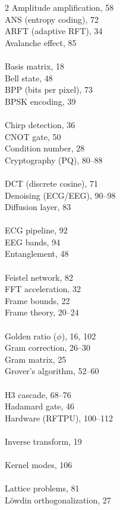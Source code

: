 \documentclass[11pt, a4paper, openany]{book}
\theoremstyle{definition}
\begin{document}
\begin{multicols}{2}
\noindent
Amplitude amplification, 58 \\
ANS (entropy coding), 72 \\
ARFT (adaptive RFT), 34 \\
Avalanche effect, 85 \\
\\
Basis matrix, 18 \\
Bell state, 48 \\
BPP (bits per pixel), 73 \\
BPSK encoding, 39 \\
\\
Chirp detection, 36 \\
CNOT gate, 50 \\
Condition number, 28 \\
Cryptography (PQ), 80--88 \\
\\
DCT (discrete cosine), 71 \\
Denoising (ECG/EEG), 90--98 \\
Diffusion layer, 83 \\
\\
ECG pipeline, 92 \\
EEG bands, 94 \\
Entanglement, 48 \\
\\
Feistel network, 82 \\
FFT acceleration, 32 \\
Frame bounds, 22 \\
Frame theory, 20--24 \\
\\
Golden ratio ($\phi$), 16, 102 \\
Gram correction, 26--30 \\
Gram matrix, 25 \\
Grover's algorithm, 52--60 \\
\\
H3 cascade, 68--76 \\
Hadamard gate, 46 \\
Hardware (RFTPU), 100--112 \\
\\
Inverse transform, 19 \\
\\
Kernel modes, 106 \\
\\
Lattice problems, 81 \\
Löwdin orthogonalization, 27 \\

\end{multicols}
\end{document}
